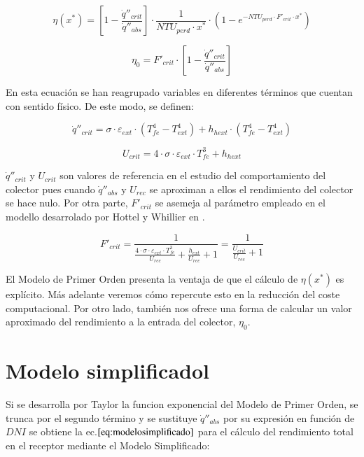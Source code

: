 \documentclass[12pt]{report} %
\begin{document}
\begin{equation}
    \eta(x^{*}) = \left[1-\frac{\dot q''_{crit}}{\dot q''_{abs}}\right] \cdot \frac{1}{NTU_{perd} \cdot x^{*}} \cdot \left(1-e^{-NTU_{perd}\cdot F'_{crit}\cdot x^{*}}\right) 
    \label{eq:primerorden}
\end{equation}

\begin{equation}
    \eta_{0} = F'_{crit} \cdot \left[1-\frac{\dot q''_{crit}}{\dot q''_{abs}}\right] 
    \label{eq:rendimiento0aproximado}
\end{equation}

En esta ecuación se han reagrupado variables en diferentes términos que cuentan con sentido físico. De este modo, se definen:

\begin{equation}
    \dot q''_{crit} = \sigma \cdot \varepsilon_{ext} \cdot \left(T^{4}_{fe}- T^{4}_{ext}\right)+h_{hext} \cdot \left(T^{4}_{fe}- T^{4}_{ext}\right)
    \label{eq:qcrit}
\end{equation}

\begin{equation}
    U_{crit} = 4 \cdot \sigma \cdot \varepsilon_{ext} \cdot T^{3}_{fe} + h_{hext}
    \label{eq:ucrit}
\end{equation}

\(\dot q''_{crit}\) y \(U_{crit}\) son valores de referencia en el estudio del comportamiento del colector pues cuando \(\dot q''_{abs}\) y \(U_{rec}\) se aproximan a ellos el rendimiento del colector se hace nulo. Por otra parte, \(F'_{crit}\) se asemeja al parámetro empleado en el modello desarrolado por Hottel y Whillier en \cite{1022085/DVRL97SH}.

\begin{equation}
    F'_{crit} = \frac{1}{\frac{4 \cdot \sigma \cdot \varepsilon_{ext} \cdot T^{3}_{fe}}{U_{rec}} + \frac{h_{ext}}{U_{rec}} +1} = \frac{1}{\frac{U_{crit}}{U_{rec}}+1}
    \label{eq:fcrit}
\end{equation}

El Modelo de Primer Orden presenta la ventaja de que el cálculo de \(\eta(x^{*})\) es explícito. Más adelante veremos cómo repercute esto en la reducción del coste computacional. Por otro lado, también nos ofrece una forma de calcular un valor aproximado del rendimiento a la entrada del colector, \(\eta_{0}\).

\section{Modelo simplificadol}
Si se desarrolla por Taylor la funcion exponencial del Modelo de Primer Orden, se trunca por el segundo término y se sustituye \(\dot q''_{abs}\) por su expresión en función de \(DNI\) se obtiene la ec.\(\eqref{eq:modelosimplificado}\) para el cálculo del rendimiento total en el receptor mediante el Modelo Simplificado:
\end{document}
